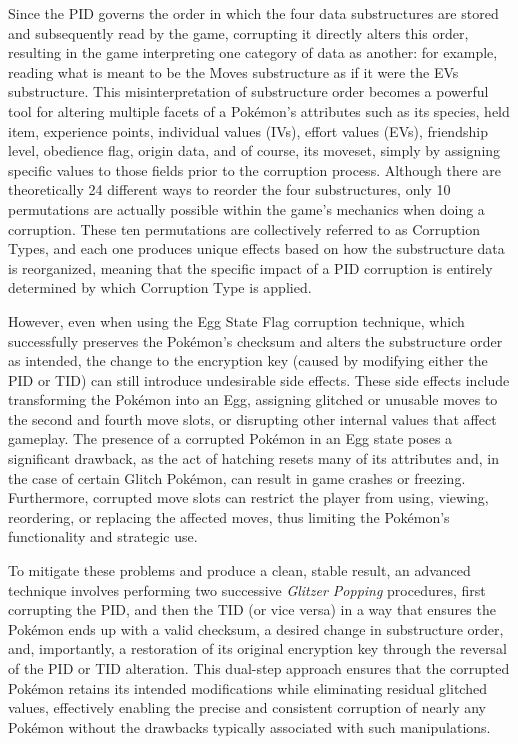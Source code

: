 \documentclass[a4paper]{usiinfbachelorproject}
\begin{document}
Since the PID governs the order in which the four data substructures are stored and subsequently read by the game, corrupting it directly alters this order, resulting in the game interpreting one category of data as another: for example, reading what is meant to be the Moves substructure as if it were the EVs substructure. This misinterpretation of substructure order becomes a powerful tool for altering multiple facets of a Pokémon's attributes such as its species, held item, experience points, individual values (IVs), effort values (EVs), friendship level, obedience flag, origin data, and of course, its moveset, simply by assigning specific values to those fields prior to the corruption process. Although there are theoretically 24 different ways to reorder the four substructures, only 10 permutations are actually possible within the game’s mechanics when doing a corruption. These ten permutations are collectively referred to as Corruption Types, and each one produces unique effects based on how the substructure data is reorganized, meaning that the specific impact of a PID corruption is entirely determined by which Corruption Type is applied.

However, even when using the Egg State Flag corruption technique, which successfully preserves the Pokémon’s checksum and alters the substructure order as intended, the change to the encryption key (caused by modifying either the PID or TID) can still introduce undesirable side effects. These side effects include transforming the Pokémon into an Egg, assigning glitched or unusable moves to the second and fourth move slots, or disrupting other internal values that affect gameplay. The presence of a corrupted Pokémon in an Egg state poses a significant drawback, as the act of hatching resets many of its attributes and, in the case of certain Glitch Pokémon, can result in game crashes or freezing. Furthermore, corrupted move slots can restrict the player from using, viewing, reordering, or replacing the affected moves, thus limiting the Pokémon's functionality and strategic use.

To mitigate these problems and produce a clean, stable result, an advanced technique involves performing two successive \textit{Glitzer Popping} procedures, first corrupting the PID, and then the TID (or vice versa) in a way that ensures the Pokémon ends up with a valid checksum, a desired change in substructure order, and, importantly, a restoration of its original encryption key through the reversal of the PID or TID alteration. This dual-step approach ensures that the corrupted Pokémon retains its intended modifications while eliminating residual glitched values, effectively enabling the precise and consistent corruption of nearly any Pokémon without the drawbacks typically associated with such manipulations.
\end{document}
